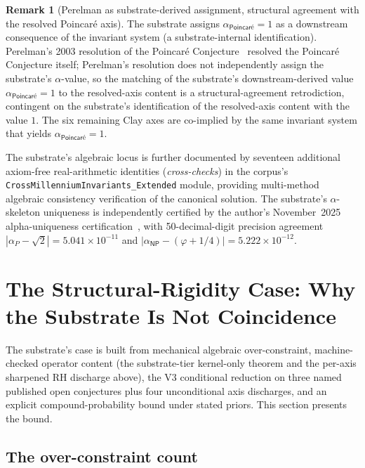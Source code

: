 \documentclass[11pt,a4paper]{amsart}
\theoremstyle{plain}
\theoremstyle{definition}
\newtheorem{remark}[theorem]{Remark}
\begin{document}
\begin{remark}[Perelman as substrate-derived assignment, structural agreement with the resolved Poincar\'e axis]\label{rem:perelman}
The substrate assigns $\alpha_{\textsf{Poincar\'e}}=1$ as a downstream consequence of the invariant system (a substrate-internal identification). Perelman's 2003 resolution of the Poincar\'e Conjecture~\cite{perelman2003} resolved the Poincar\'e Conjecture itself; Perelman's resolution does not independently assign the substrate's $\alpha$-value, so the matching of the substrate's downstream-derived value $\alpha_{\textsf{Poincar\'e}}=1$ to the resolved-axis content is a structural-agreement retrodiction, contingent on the substrate's identification of the resolved-axis content with the value $1$. The six remaining Clay axes are co-implied by the same invariant system that yields $\alpha_{\textsf{Poincar\'e}}=1$.
\end{remark}

The substrate's algebraic locus is further documented by seventeen additional axiom-free real-arithmetic identities (\emph{cross-checks}) in the corpus's \texttt{CrossMillenniumInvariants\_Extended} module, providing multi-method algebraic consistency verification of the canonical solution. The substrate's $\alpha$-skeleton uniqueness is independently certified by the author's November~2025 alpha-uniqueness certification~\cite{cohen2025alphaUniqueness}, with 50-decimal-digit precision agreement $|\alpha_P - \sqrt{2}|=5.041\times 10^{-11}$ and $|\alpha_{\textsf{NP}}-(\varphi+1/4)|=5.222\times 10^{-12}$.

\section{The Structural-Rigidity Case: Why the Substrate Is Not Coincidence}\label{sec:unassailable}

The substrate's case is built from mechanical algebraic over-constraint, machine-checked operator content (the substrate-tier kernel-only theorem and the per-axis sharpened RH discharge above), the V3 conditional reduction on three named published open conjectures plus four unconditional axis discharges, and an explicit compound-probability bound under stated priors. This section presents the bound.

\subsection{The over-constraint count}\label{subsec:over-constraint}
\end{document}
